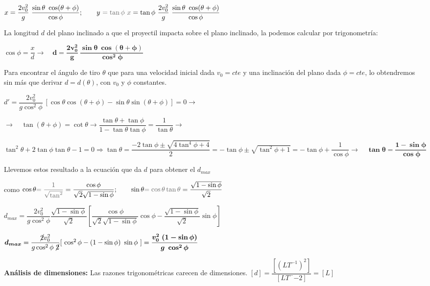 $x=\dfrac{2v_0^2}{g}\ \dfrac {\sin \theta \ \cos (\theta+\phi)}{\cos \phi}; \qquad y\ \textcolor{gris}{=\tan \phi \ x }= \tan \phi \ \dfrac{2v_0^2}{g}\ \dfrac {\sin \theta \ \cos (\theta+\phi)}{\cos \phi}$

La longitud $d$ del plano inclinado a que el proyectil impacta sobre el plano inclinado, la podemos calcular por trigonometría:

$\cos \phi = \dfrac x d \to \quad \boldsymbol{d= \dfrac{2v_0^2}{g}\ \dfrac {\sin \theta \ \cos (\theta+\phi)}{\cos^2 \phi} }$ 


Para encontrar el ángulo de tiro $\theta$ que para una velocidad inicial dada $v_0=cte$ y una inclinación del plano dada $\phi=cte$, lo obtendremos sin más que derivar $d=d(\theta)$, con $v_0$ y $\phi$ constantes. 

$d'=\dfrac {2 v_0^2}{g  \cos^2 \phi}\ \left[ \cos \theta \cos (\theta+\phi) - \sin \theta \sin(\theta+\phi) \right]=0 \to $

$ \to \quad \tan (\theta + \phi)=\cot \theta \to \dfrac {\tan \theta + \tan \phi}{1-\tan\theta \tan \phi}=\dfrac {1}{\tan \theta} \to $

$\tan^2 \theta +2\tan\phi \tan \theta -1 =0 \Rightarrow \tan \theta= \dfrac {-2\tan \phi \pm \sqrt{4\tan^4 \phi+4}}{2}=-\tan \phi \pm \sqrt{\tan^2 \phi + 1}=-\tan \phi + \dfrac{1}{\cos \phi} \to \quad \boldsymbol { \tan \theta = \dfrac {1-\sin \phi}{\cos \phi} }$


Llevemos estos resultado a la ecuación que da $d$ para obtener el $d_{max}$

como $\cos \theta \textcolor{gris}{= \dfrac 1 {\sqrt{\tan^2}}} =\dfrac {\cos \phi}{\sqrt{2} \sqrt{1-\sin \phi}}; \qquad \sin \theta \textcolor{gris}{=\cos \theta \tan \theta}=\dfrac{\sqrt{1-\sin \phi}}{\sqrt{2}}$

$ d_{max}  =\dfrac {2 v_0^2}{g \cos^2 \phi} \dfrac {\sqrt{1-\sin \phi}}{\sqrt{2}} \left[
\dfrac {\cos \phi}{\sqrt{2}\sqrt{1-\sin \phi}}\cos \phi - \dfrac{\sqrt{1-\sin \phi}}{\sqrt{2}}\sin \phi
\right] $ 

$\boldsymbol{d_{max}} =\dfrac{\cancel{2} v_0^2}{g \cos^2 \phi \ \cancel{2}}[ \ \cos^2 \phi - (1-\sin \phi)\ \sin \phi  \ ]  = \boldsymbol{\dfrac {v_0^2 \ (1-\sin \phi)}{g \ \cos^2 \phi}}$

\vspace{4mm} \textbf{Análisis de dimensiones:} Las razones trigonométricas carecen de dimensiones. $[d]=\dfrac{[(LT^{-1})^2]}{[LT^-{-2}]}=[L]$

